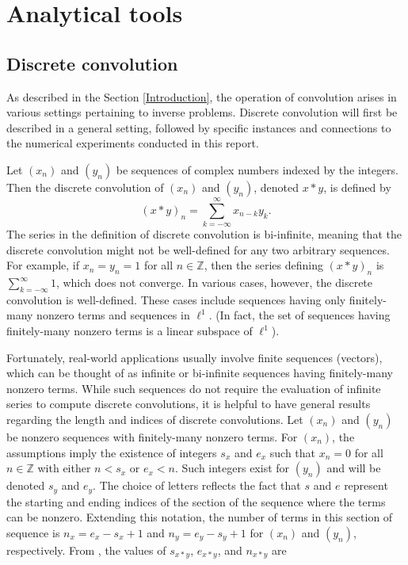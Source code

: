 \documentclass[12pt]{article}
\begin{document}
\section{Analytical tools} \label{Analytical tools}

\subsection{Discrete convolution} \label{Discrete convolution}
As described in the Section \ref{Introduction}, the operation of convolution arises in various settings pertaining to inverse problems. Discrete convolution will first be described  in a general setting, followed by specific instances and connections to the numerical experiments conducted in this report. \par
Let $(x_n)$ and $(y_n)$ be sequences of complex numbers indexed by the integers. Then the discrete convolution of $(x_n)$ and $(y_n)$, denoted $x*y$, is defined by
\[(x*y)_n = \sum_{k=-\infty}^\infty x_{n-k}y_k.\]
The series in the definition of discrete convolution is bi-infinite, meaning that the discrete convolution might not be well-defined for any two arbitrary sequences. For example, if $x_n = y_n = 1$ for all $n \in \mathbb{Z}$, then the series defining $(x*y)_n$ is $\sum_{k=-\infty}^\infty 1$, which does not converge. In various cases, however, the discrete convolution is well-defined. These cases include sequences having only finitely-many nonzero terms and sequences in $\ell^1$. (In fact, the set of sequences having finitely-many nonzero terms is a linear subspace of $\ell^1$).  \par 
Fortunately, real-world applications usually involve finite sequences (vectors), which can be thought of as infinite or bi-infinite sequences having finitely-many nonzero terms. While such sequences do not require the evaluation of infinite series to compute discrete convolutions, it is helpful to have general results regarding the length and indices of discrete convolutions. Let $(x_n)$ and $(y_n)$ be nonzero sequences with finitely-many nonzero terms. For $(x_n)$, the assumptions imply the existence of integers $s_x$ and $e_x$ such that $x_n = 0$ for all $n \in \mathbb{Z}$ with either $n < s_x$ or $e_x < n$. Such integers exist for $(y_n)$ and will be denoted $s_y$ and $e_y$. The choice of letters reflects the fact that $s$ and $e$ represent the starting and ending indices of the section of the sequence where the terms can be nonzero. Extending this notation, the number of terms in this section of sequence is $n_x = e_x - s_x + 1$ and $n_y = e_y - s_y + 1$ for $(x_n)$ and $(y_n)$, respectively. From \cite{BoggessAlbert2001Afci}, the values of $s_{x*y}$, $e_{x*y}$, and $n_{x*y}$ are
\end{document}
